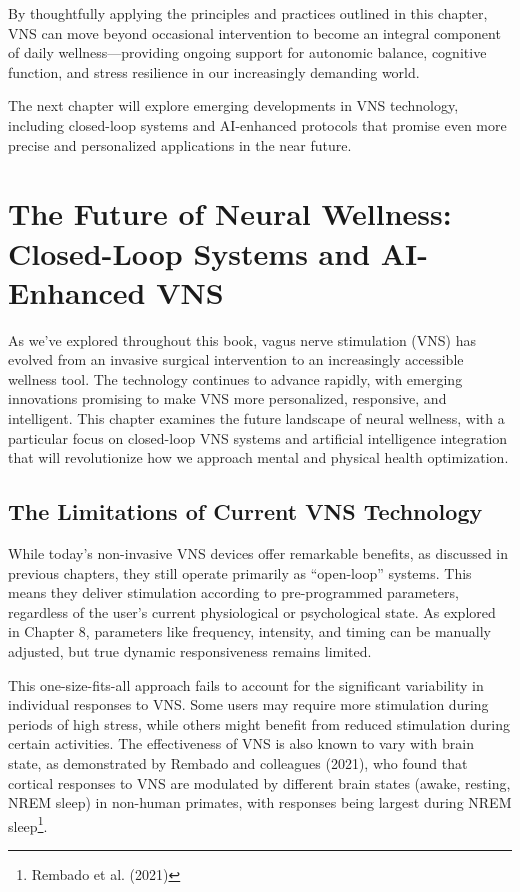 \documentclass[
  Letterpaper,
]{scrbook}
\begin{document}
By thoughtfully applying the principles and practices outlined in this
chapter, VNS can move beyond occasional intervention to become an
integral component of daily wellness---providing ongoing support for
autonomic balance, cognitive function, and stress resilience in our
increasingly demanding world.

The next chapter will explore emerging developments in VNS technology,
including closed-loop systems and AI-enhanced protocols that promise
even more precise and personalized applications in the near future.


\chapter{The Future of Neural Wellness: Closed-Loop Systems and
AI-Enhanced
VNS}\label{the-future-of-neural-wellness-closed-loop-systems-and-ai-enhanced-vns}

As we've explored throughout this book, vagus nerve stimulation (VNS)
has evolved from an invasive surgical intervention to an increasingly
accessible wellness tool. The technology continues to advance rapidly,
with emerging innovations promising to make VNS more personalized,
responsive, and intelligent. This chapter examines the future landscape
of neural wellness, with a particular focus on closed-loop VNS systems
and artificial intelligence integration that will revolutionize how we
approach mental and physical health optimization.

\section{The Limitations of Current VNS
Technology}\label{the-limitations-of-current-vns-technology}

While today's non-invasive VNS devices offer remarkable benefits, as
discussed in previous chapters, they still operate primarily as
``open-loop'' systems. This means they deliver stimulation according to
pre-programmed parameters, regardless of the user's current
physiological or psychological state. As explored in Chapter 8,
parameters like frequency, intensity, and timing can be manually
adjusted, but true dynamic responsiveness remains limited.

This one-size-fits-all approach fails to account for the significant
variability in individual responses to VNS. Some users may require more
stimulation during periods of high stress, while others might benefit
from reduced stimulation during certain activities. The effectiveness of
VNS is also known to vary with brain state, as demonstrated by Rembado
and colleagues (2021), who found that cortical responses to VNS are
modulated by different brain states (awake, resting, NREM sleep) in
non-human primates, with responses being largest during NREM
sleep\footnote{Rembado et al. (2021)}.
\end{document}
